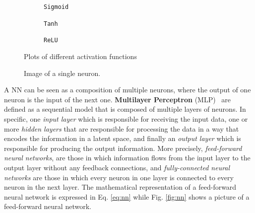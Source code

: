 \begin{figure}[ht]
    \centering
    \begin{subfigure}[b]{0.30\textwidth}
        \centering
        \fbox{\rule[-.5cm]{0cm}{4cm} \rule[-.5cm]{4cm}{0cm}}
        \caption{\texttt{Sigmoid}}
        \label{fig:sigmoid}
    \end{subfigure}
    \hfill
    \begin{subfigure}[b]{0.30\textwidth}
        \centering
        \fbox{\rule[-.5cm]{0cm}{4cm} \rule[-.5cm]{4cm}{0cm}}
        \caption{\texttt{Tanh}}
        \label{fig:tanh}
    \end{subfigure}
    \hfill
    \begin{subfigure}[b]{0.30\textwidth}
        \centering
        \fbox{\rule[-.5cm]{0cm}{4cm} \rule[-.5cm]{4cm}{0cm}}
        \caption{\texttt{ReLU}}
        \label{fig:relu}
    \end{subfigure}
    \caption{Plots of different activation functions}
    \label{fig:activation_functions}
\end{figure}





\begin{figure}[ht]
    \begin{center}
        \fbox{\rule[-.5cm]{0cm}{4cm} \rule[-.5cm]{4cm}{0cm}}
    \end{center}
    \caption{Image of a single neuron.}
    \label{fig:single_neuron}
\end{figure}


A NN can be seen as a composition of multiple neurons, where the output of one neuron is the input of the next one.
\textbf{Multilayer Perceptron} (MLP)~\citep{rumelhart1986learning} are defined as a sequential model that is composed of multiple layers of neurons.
In specific, one \textit{input layer} which is responsible for receiving the input data, one or more \textit{hidden layers} that are responsible for processing the data in a way that encodes the information in a latent space, and finally an \textit{output layer} which is responsible for producing the output information.
More precisely, \textit{feed-forward neural networks}, are those in which information flows from the input layer to the output layer without any feedback connections, and \textit{fully-connected neural networks} are those in which every neuron in one layer is connected to every neuron in the next layer.
The mathematical representation of a feed-forward neural network is expressed in Eq. \ref{eq:nn} while Fig. \ref{fig:nn} shows a picture of a feed-forward neural network.


